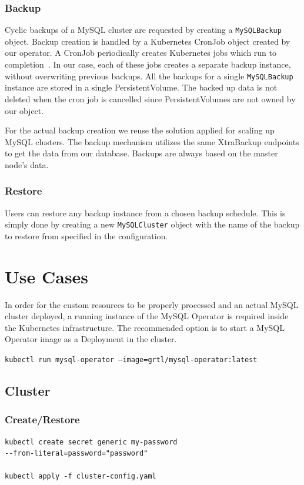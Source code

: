 \subsubsection*{Backup}
Cyclic backups of a MySQL cluster are requested by creating a \texttt{MySQLBackup} object. Backup creation is
handled by a Kubernetes CronJob object created by our operator. A CronJob periodically creates
Kubernetes jobs which run to completion~\cite{kube-comp}. In our case, each of these jobs creates a
separate backup instance, without overwriting previous backups. All the backups for a single
\texttt{MySQLBackup} instance are stored in a single PersistentVolume. The backed up data is not deleted when
the cron job is cancelled since PersistentVolumes are not owned by our object.

For the actual backup creation we reuse the solution applied for scaling up MySQL clusters. The
backup mechanism utilizes the same XtraBackup endpoints to get the data from our database. Backups
are always based on the master node’s data.

\subsubsection*{Restore}
Users can restore any backup instance from a chosen backup schedule. This is simply done by creating
a new \texttt{MySQLCluster} object with the name of the backup to restore from specified in the
configuration.

\section{Use Cases}
In order for the custom resources to be properly processed and an actual MySQL cluster deployed, a
running instance of the MySQL Operator is required inside the Kubernetes infrastructure. The
recommended option is to start a MySQL Operator image as a Deployment in the cluster.

\texttt{kubectl run mysql-operator --image=grtl/mysql-operator:latest}

\subsection{Cluster}
\subsubsection*{Create/Restore}
\begin{lstlisting}
kubectl create secret generic my-password
--from-literal=password="password"

kubectl apply -f cluster-config.yaml
\end{lstlisting}


